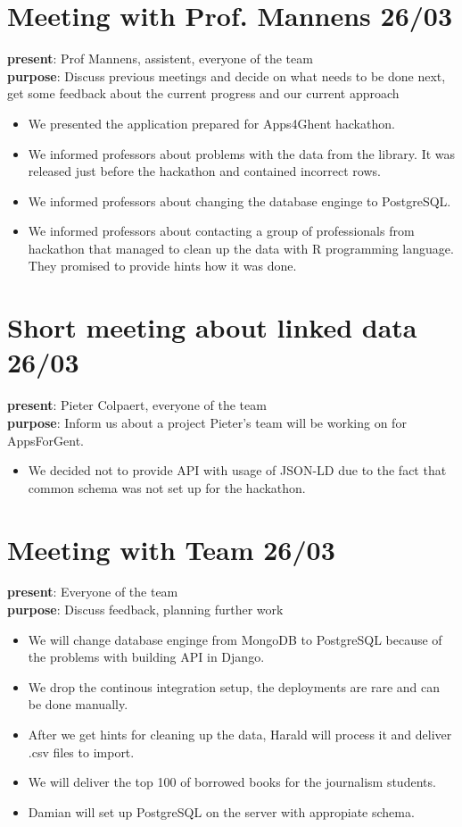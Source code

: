 \section{Meeting with Prof. Mannens 26/03}
{\bf present}: Prof Mannens, assistent, everyone of the team\\
{\bf purpose}: Discuss previous meetings and decide on what needs to be done next, get some feedback about the current progress and our current approach\\
\begin{itemize}
	\item We presented the application prepared for Apps4Ghent hackathon.
	\item We informed professors about problems with the data from the library. It was released just before the hackathon and contained incorrect rows.
	\item We informed professors about changing the database enginge to PostgreSQL.
	\item We informed professors about contacting a group of professionals from hackathon that managed to clean up the data with R programming language. They promised to provide hints how it was done.
\end{itemize}

\section{Short meeting about linked data 26/03}
{\bf present}: Pieter Colpaert, everyone of the team\\
{\bf purpose}: Inform us about a project Pieter's team will be working on for AppsForGent.
\begin{itemize}
	\item We decided not to provide API with usage of JSON-LD due to the fact that common schema was not set up for the hackathon.
\end{itemize}

\section{Meeting with Team 26/03}
{\bf present}: Everyone of the team\\
{\bf purpose}: Discuss feedback, planning further work\\
\begin{itemize}
	\item We will change database enginge from MongoDB to PostgreSQL because of the problems with building API in Django.
	\item We drop the continous integration setup, the deployments are rare and can be done manually.
	\item After we get hints for cleaning up the data, Harald will process it and deliver .csv files to import.
	\item We will deliver the top 100 of borrowed books for the journalism students.
	\item Damian will set up PostgreSQL on the server with appropiate schema.
\end{itemize}

